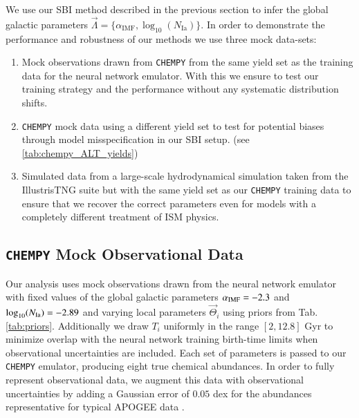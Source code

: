 \documentclass{aa}
\begin{document}
We use our SBI method described in the previous section to infer the global galactic parameters $\vec\Lambda = \{\alpha_\mathrm{IMF},\log_{10}(N_\mathrm{Ia})\}$. In order to demonstrate the performance and robustness of our methods we use three mock data-sets: 
\begin{enumerate}
    \item Mock observations drawn from \texttt{CHEMPY} from the same yield set as the training data for the neural network emulator. With this we ensure to test our training strategy and the performance without any systematic distribution shifts. 
    \item  \texttt{CHEMPY} mock data using a different yield set to test for potential biases through model misspecification in our SBI setup. (see  \ref{tab:chempy_ALT_yields})
    \item Simulated data from a large-scale hydrodynamical simulation taken from the IllustrisTNG suite \citep{Pillepich2018} but with the same yield set as our \texttt{CHEMPY} training data to ensure that we recover the correct parameters even for models with a completely different treatment of ISM physics.
\end{enumerate}

\subsection{\texttt{CHEMPY} Mock Observational Data}
Our analysis uses mock observations drawn from the neural network emulator with fixed values of the global galactic parameters $\alpha_{\rm IMF}=-2.3$ and $\log_{10}(N_{\rm Ia})=-2.89$ and varying local parameters $\vec{\Theta}_i$ using priors from Tab. \ref{tab:priors}. Additionally we draw $T_i$ uniformly in the range $[2,12.8]$ Gyr to minimize overlap with the neural network training birth-time limits when observational uncertainties are included. 
Each set of parameters is passed to our \texttt{CHEMPY} emulator, producing eight true chemical abundances. In order to fully represent observational data, we augment this data with observational uncertainties by adding a Gaussian error of $0.05$ dex for the abundances representative for typical APOGEE data \citep{Majewski2016}.
\end{document}
